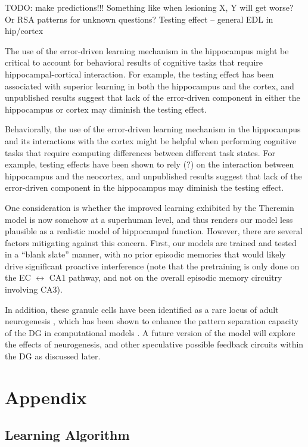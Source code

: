 \documentclass[11pt,twoside]{article}
\newif\myifpdf
\begin{document}
TODO: make predictions!!!
Something like when lesioning X, Y will get worse?
Or RSA patterns for unknown questions?
Testing effect -- general EDL in hip/cortex

The use of the error-driven learning mechanism in the hippocampus might be critical to account for behavioral results of cognitive tasks that require hippocampal-cortical interaction. For example, the testing effect has been associated with superior learning in both the hippocampus and the cortex, and unpublished results suggest that lack of the error-driven component in either the hippocampus or cortex may diminish the testing effect.

Behaviorally, the use of the error-driven learning mechanism in the hippocampus and its interactions with the cortex might be helpful when performing cognitive tasks that require computing differences between different task states. For example, testing effects have been shown to rely (?) on the interaction between hippocampus and the neocortex, and unpublished results suggest that lack of the error-driven component in the hippocampus may diminish the testing effect.

One consideration is whether the improved learning exhibited by the Theremin model is now somehow at a superhuman level, and thus renders our model less plausible as a realistic model of hippocampal function.  However, there are several factors mitigating against this concern.  First, our models are trained and tested in a ``blank slate'' manner, with no prior episodic memories that would likely drive significant proactive interference (note that the pretraining is only done on the EC $\leftrightarrow$ CA1 pathway, and not on the overall episodic memory circuitry involving CA3).  

In addition, these granule cells have been identified as a rare locus of adult neurogenesis \citep{neurogenesis}, which has been shown to enhance the pattern separation capacity of the DG in computational models \citep{Becker}.  A future version of the model will explore the effects of neurogenesis, and other speculative possible feedback circuits within the DG as discussed later.

\section{Appendix}

\subsection{Learning Algorithm}
\end{document}
